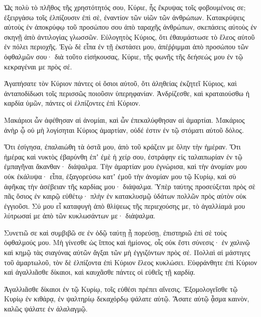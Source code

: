 \begin{spacing}{1.1}
\begin{multicols}{2}
Ὡς πολὺ τὸ πλῆθος τῆς χρηστότητός σου, Κύριε, ἧς ἔκρυψας τοῖς φοβουμένοις σε; ἐξειργάσω τοῖς ἐλπίζουσιν ἐπὶ σὲ, ἐναντίον τῶν υἱῶν τῶν ἀνθρώπων.
Κατακρύψεις αὐτοὺς ἐν ἀποκρύφῳ τοῦ προσώπου σου ἀπὸ ταραχῆς ἀνθρώπων, σκεπάσεις αὐτοὺς ἐν σκηνῇ ἀπὸ ἀντιλογίας γλωσσῶν.
Εὐλογητὸς Κύριος, ὅτι ἐθαυμάστωσε τὸ ἔλεος αὐτοῦ ἐν πόλει περιοχῆς.
Ἐγὼ δὲ εἶπα ἐν τῇ ἐκστάσει μου, ἀπέῤῥιμμαι ἀπὸ προσώπου τῶν ὀφθαλμῶν σου· διὰ τοῦτο εἰσήκουσας, Κύριε, τῆς φωνῆς τῆς δεήσεώς μου ἐν τῷ κεκραγέναι με πρὸς σέ.

Ἀγαπήσατε τὸν Κύριον πάντες οἱ ὅσιοι αὐτοῦ, ὅτι ἀληθείας ἐκζητεῖ Κύριος, καὶ ἀνταποδίδωσι τοῖς περισσῶς ποιοῦσιν ὑπερηφανίαν.
Ἀνδρίζεσθε, καὶ κραταιούσθω ἡ καρδία ὑμῶν, πάντες οἱ ἐλπίζοντες ἐπὶ Κύριον.

Μακάριοι ὧν ἀφέθησαν αἱ ἀνομίαι, καὶ ὧν ἐπεκαλύφθησαν αἱ ἁμαρτίαι.
Μακάριος ἀνὴρ ᾧ οὐ μὴ λογίσηται Κύριος ἁμαρτίαν, οὐδέ ἐστιν ἐν τῷ στόματι αὐτοῦ δόλος.

Ὅτι ἐσίγησα, ἐπαλαιώθη τὰ ὀστᾶ μου, ἀπὸ τοῦ κράζειν με ὅλην τὴν ἡμέραν.
Ὅτι ἡμέρας καὶ νυκτὸς ἐβαρύνθη ἐπʼ ἐμὲ ἡ χείρ σου, ἐστράφην εἰς ταλαιπωρίαν ἐν τῷ ἐμπαγῆναι ἄκανθαν· διάψαλμα.
Τὴν ἁμαρτίαν μου ἐγνώρισα, καὶ τὴν ἀνομίαν μου οὐκ ἐκάλυψα· εἶπα, ἐξαγορεύσω κατʼ ἐμοῦ τὴν ἀνομίαν μου τῷ Κυρίῳ, καὶ σὺ ἀφῆκας τὴν ἀσέβειαν τῆς καρδίας μου· διάψαλμα.
Ὑπὲρ ταύτης προσεύξεται πρὸς σὲ πᾶς ὅσιος ἐν καιρῷ εὐθέτῳ· πλὴν ἐν κατακλυσμῷ ὑδάτων πολλῶν πρὸς αὐτὸν οὐκ ἐγγιοῦσι.
Σύ μου εἶ καταφυγὴ ἀπὸ θλίψεως τῆς περιεχούσης με, τὸ ἀγαλλίαμά μου λύτρωσαί με ἀπὸ τῶν κυκλωσάντων με· διάψαλμα.

Συνετιῶ σε καὶ συμβιβῶ σε ἐν ὁδῷ ταύτῃ ᾗ πορεύσῃ, ἐπιστηριῶ ἐπὶ σὲ τοὺς ὀφθαλμούς μου.
Μὴ γίνεσθε ὡς ἵππος καὶ ἡμίονος, οἷς οὐκ ἔστι σύνεσις· ἐν χαλινῷ καὶ κημῷ τὰς σιαγόνας αὐτῶν ἄγξαι τῶν μὴ ἐγγιζόντων πρὸς σέ.
Πολλαὶ αἱ μάστιγες τοῦ ἁμαρτωλοῦ, τὸν δὲ ἐλπίζοντα ἐπὶ Κύριον ἔλεος κυκλώσει.
Εὐφράνθητε ἐπὶ Κύριον καὶ ἀγαλλιᾶσθε δίκαιοι, καὶ καυχᾶσθε πάντες οἱ εὐθεῖς τῇ καρδίᾳ.

Ἀγαλλιᾶσθε δίκαιοι ἐν τῷ Κυρίῳ, τοῖς εὐθέσι πρέπει αἴνεσις.
Ἐξομολογεῖσθε τῷ Κυρίῳ ἐν κιθάρᾳ, ἐν ψαλτηρίῳ δεκαχόρδῳ ψάλατε αὐτῷ.
Ἄσατε αὐτῷ ᾆσμα καινὸν, καλῶς ψάλατε ἐν ἀλαλαγμῷ.


\end{multicols}
\end{spacing}
